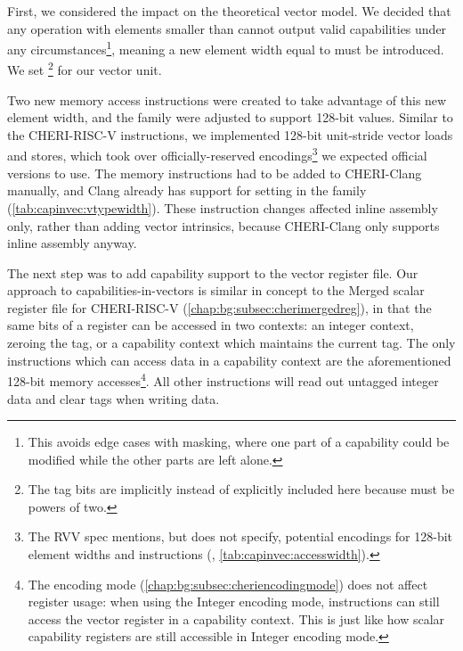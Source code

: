 \documentclass[../thesis]{subfiles}
\begin{document}
First, we considered the impact on the theoretical vector model.
We decided that any operation with elements smaller than  cannot output valid capabilities under any circumstances\footnote{This avoids edge cases with masking, where one part of a capability could be modified while the other parts are left alone.}, meaning a new element width equal to  must be introduced.
We set \footnote{The tag bits are implicitly instead of explicitly included here because  must be powers of two.} for our vector unit.

Two new memory access instructions were created to take advantage of this new element width, and the  family were adjusted to support 128-bit values.
Similar to the CHERI-RISC-V  instructions, we implemented 128-bit unit-stride vector loads and stores, which took over officially-reserved encodings\footnote{The RVV spec mentions, but does not specify, potential encodings for 128-bit element widths and instructions (\cite[p10, p32]{specification-RVV-v1.0}, \cref{tab:capinvec:accesswidth}).} we expected official versions to use.
The memory instructions had to be added to CHERI-Clang manually, and Clang already has support for setting  in the  family (\cref{tab:capinvec:vtypewidth}).
These instruction changes affected inline assembly only, rather than adding vector intrinsics, because CHERI-Clang only supports inline assembly anyway.

% 

The next step was to add capability support to the vector register file.
Our approach to capabilities-in-vectors is similar in concept to the Merged scalar register file for CHERI-RISC-V (\cref{chap:bg:subsec:cherimergedreg}), in that the same bits of a register can be accessed in two contexts: an integer context, zeroing the tag, or a capability context which maintains the current tag.
The only instructions which can access data in a capability context are the aforementioned 128-bit memory accesses\footnote{The encoding mode (\cref{chap:bg:subsec:cheriencodingmode}) does not affect register usage: when using the Integer encoding mode, instructions can still access the vector register in a capability context. This is just like how scalar capability registers are still accessible in Integer encoding mode.}.
All other instructions will read out untagged integer data and clear tags when writing data.
\end{document}
